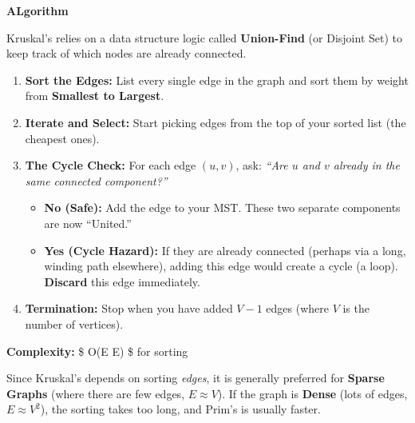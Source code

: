 \documentclass[
  letterpaper,
  DIV=11,
  numbers=noendperiod]{scrreprt}
\providecommand{\tightlist}{%
  \setlength{\itemsep}{0pt}\setlength{\parskip}{0pt}}
\begin{document}
\textbf{ALgorithm}

Kruskal's relies on a data structure logic called \textbf{Union-Find}
(or Disjoint Set) to keep track of which nodes are already connected.

\begin{enumerate}
\def\labelenumi{\arabic{enumi}.}
\item
  \textbf{Sort the Edges:} List every single edge in the graph and sort
  them by weight from \textbf{Smallest to Largest}.
\item
  \textbf{Iterate and Select:} Start picking edges from the top of your
  sorted list (the cheapest ones).
\item
  \textbf{The Cycle Check:} For each edge \((u, v)\), ask: \emph{``Are
  \(u\) and \(v\) already in the same connected component?''}

  \begin{itemize}
  \tightlist
  \item
    \textbf{No (Safe):} Add the edge to your MST. These two separate
    components are now ``United.''
  \item
    \textbf{Yes (Cycle Hazard):} If they are already connected (perhaps
    via a long, winding path elsewhere), adding this edge would create a
    cycle (a loop). \textbf{Discard} this edge immediately.
  \end{itemize}
\item
  \textbf{Termination:} Stop when you have added \(V-1\) edges (where
  \(V\) is the number of vertices).
\end{enumerate}

\textbf{Complexity:} \$ O(E \log E) \$ for sorting

\begin{tcolorbox}[enhanced jigsaw, leftrule=.75mm, rightrule=.15mm, colback=white, colbacktitle=quarto-callout-tip-color!10!white, arc=.35mm, opacityback=0, toptitle=1mm, bottomrule=.15mm, bottomtitle=1mm, titlerule=0mm, title=\textcolor{quarto-callout-tip-color}{\faLightbulb}\hspace{0.5em}{Insight: When to use which?}, toprule=.15mm, left=2mm, coltitle=black, breakable, colframe=quarto-callout-tip-color-frame, opacitybacktitle=0.6]

Since Kruskal's depends on sorting \emph{edges}, it is generally
preferred for \textbf{Sparse Graphs} (where there are few edges,
\(E \approx V\)). If the graph is \textbf{Dense} (lots of edges,
\(E \approx V^2\)), the sorting takes too long, and Prim's is usually
faster.

\end{tcolorbox}
\end{document}
